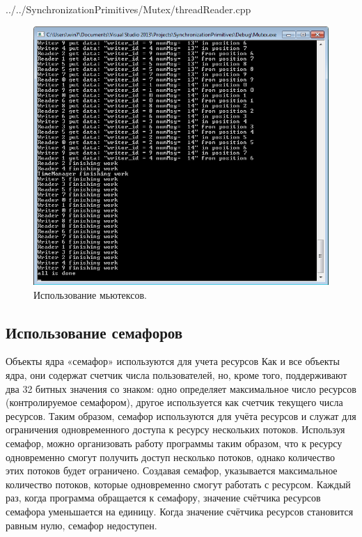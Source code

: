 \documentclass[a4paper, 12pt]{article}		%
\begin{document}

{../../SynchronizationPrimitives/Mutex/threadReader.cpp}

\begin{figure}[h!!]
\centering
\includegraphics[scale=1]{res/001}
\caption{Использование мьютексов.}
\end{figure}

\newpage
\subsection{Использование семафоров}

Объекты ядра «семафор» используются для учета ресурсов Как и все объекты ядра, они содержат счетчик числа пользователей, но, кроме того, поддерживают два 32 битных значения со знаком: одно определяет максимальное число ресурсов (контролируемое семафором), другое используется как счетчик текущего числа ресурсов. Таким образом, семафор используются для учёта ресурсов и служат для ограничения одновременного доступа к ресурсу нескольких потоков. Используя семафор, можно организовать работу программы таким образом, что к ресурсу одновременно смогут получить доступ несколько потоков, однако количество этих потоков будет ограничено. Создавая семафор, указывается максимальное количество потоков, которые одновременно смогут работать с ресурсом. Каждый раз, когда программа обращается к семафору, значение счётчика ресурсов семафора уменьшается на единицу. Когда значение счётчика ресурсов становится равным нулю, семафор недоступен.
\end{document}
